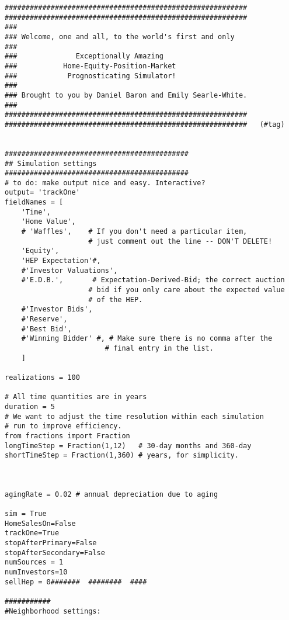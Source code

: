 \begin{lstlisting}
##########################################################
##########################################################
###
### Welcome, one and all, to the world's first and only
###
###              Exceptionally Amazing
###           Home-Equity-Position-Market
###            Prognosticating Simulator!
###
### Brought to you by Daniel Baron and Emily Searle-White.
###
##########################################################
##########################################################   (#tag)


############################################
## Simulation settings
############################################
# to do: make output nice and easy. Interactive?
output= 'trackOne'
fieldNames = [
    'Time',
    'Home Value',
    # 'Waffles',    # If you don't need a particular item,
                    # just comment out the line -- DON'T DELETE!
    'Equity',
    'HEP Expectation'#,
    #'Investor Valuations',
    #'E.D.B.',       # Expectation-Derived-Bid; the correct auction
                    # bid if you only care about the expected value
                    # of the HEP.
    #'Investor Bids',
    #'Reserve',
    #'Best Bid',
    #'Winning Bidder' #, # Make sure there is no comma after the
                        # final entry in the list.
    ]

realizations = 100

# All time quantities are in years
duration = 5
# We want to adjust the time resolution within each simulation
# run to improve efficiency.
from fractions import Fraction
longTimeStep = Fraction(1,12)   # 30-day months and 360-day
shortTimeStep = Fraction(1,360) # years, for simplicity.



agingRate = 0.02 # annual depreciation due to aging

sim = True
HomeSalesOn=False
trackOne=True
stopAfterPrimary=False
stopAfterSecondary=False
numSources = 1
numInvestors=10
sellHep = 0#######  ########  ####

###########
#Neighborhood settings:


\end{lstlisting}
